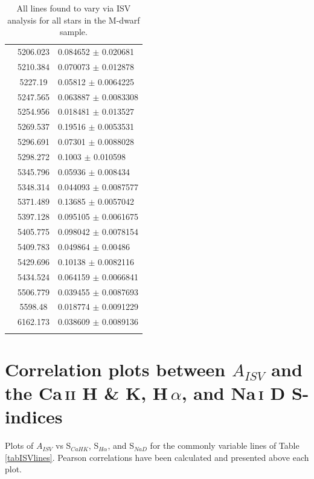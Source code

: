 \begin{longtable}{|c|c|l|}
 & 5206.023 & 0.084652 $\pm$ 0.020681 \\        
 & 5210.384 & 0.070073 $\pm$ 0.012878 \\        
 & 5227.19 & 0.05812 $\pm$ 0.0064225 \\         
 & 5247.565 & 0.063887 $\pm$ 0.0083308 \\       
 & 5254.956 & 0.018481 $\pm$ 0.013527 \\        
 & 5269.537 & 0.19516 $\pm$ 0.0053531 \\        
 & 5296.691 & 0.07301 $\pm$ 0.0088028 \\        
 & 5298.272 & 0.1003 $\pm$ 0.010598 \\          
 & 5345.796 & 0.05936 $\pm$ 0.008434 \\         
 & 5348.314 & 0.044093 $\pm$ 0.0087577 \\       
 & 5371.489 & 0.13685 $\pm$ 0.0057042 \\        
 & 5397.128 & 0.095105 $\pm$ 0.0061675 \\       
 & 5405.775 & 0.098042 $\pm$ 0.0078154 \\       
 & 5409.783 & 0.049864 $\pm$ 0.00486 \\         
 & 5429.696 & 0.10138 $\pm$ 0.0082116 \\        
 & 5434.524 & 0.064159 $\pm$ 0.0066841 \\       
 & 5506.779 & 0.039455 $\pm$ 0.0087693 \\       
 & 5598.48 & 0.018774 $\pm$ 0.0091229 \\        
 & 6162.173 & 0.038609 $\pm$ 0.0089136 \\       
\hline                                          
    \caption{All lines found to vary via ISV analysis for all stars in the M-dwarf sample.}
    \label{tabAllLinesAllStars}
\end{longtable}
\chapter{Correlation plots between $A_{ISV}$ and the Ca\,\textsc{ii} H \& K, H\,\textsc{$\alpha$}, and Na\,\textsc{i} D S-indices}
\label{secCorrPlots}
Plots of $A_{ISV}$ vs S$_{CaHK}$, S$_{H\alpha}$, and S$_{NaD}$ for the commonly variable lines of Table\,\ref{tabISVlines}. Pearson correlations have been calculated and presented above each plot.\\

